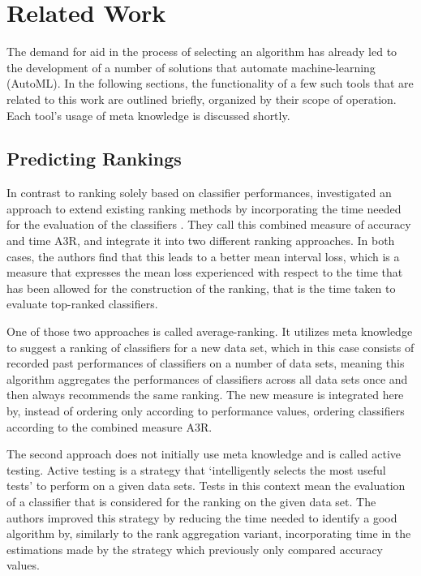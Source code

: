 \chapter{Related Work}
\label{sec:related}
The demand for aid in the process of selecting an algorithm has already led to the development of a number of solutions that automate machine-learning (AutoML). In the following sections, the functionality of a few such tools that are related to this work are outlined briefly, organized by their scope of operation. Each tool's usage of meta knowledge is discussed shortly.

\section{Predicting Rankings}
\label{sec:related:rankings}
In contrast to ranking solely based on classifier performances, \citeauthor{DBLP:journals/ml/AbdulrahmanBRV18} investigated an approach to extend existing ranking methods by incorporating the time needed for the evaluation of the classifiers \cite{DBLP:journals/ml/AbdulrahmanBRV18}. They call this combined measure of accuracy and time A3R, and integrate it into two different ranking approaches. In both cases, the authors find that this leads to a better mean interval loss, which is a measure that expresses the mean loss experienced with respect to the time that has been allowed for the construction of the ranking, that is the time taken to evaluate top-ranked classifiers. 

One of those two approaches is called average-ranking. It utilizes meta knowledge to suggest a ranking of classifiers for a new data set, which in this case consists of recorded past performances of classifiers on a number of data sets, meaning this algorithm aggregates the performances of classifiers across all data sets once and then always recommends the same ranking. The new measure is integrated here by, instead of ordering only according to performance values, ordering classifiers according to the combined measure A3R.

The second approach does not initially use meta knowledge and is called active testing. Active testing is a strategy that `intelligently selects the most useful tests' \cite{DBLP:journals/ml/AbdulrahmanBRV18} to perform on a given data sets. Tests in this context mean the evaluation of a classifier that is considered for the ranking on the given data set. The authors improved this strategy by reducing the time needed to identify a good algorithm by, similarly to the rank aggregation variant, incorporating time in the estimations made by the strategy which previously only compared accuracy values.

